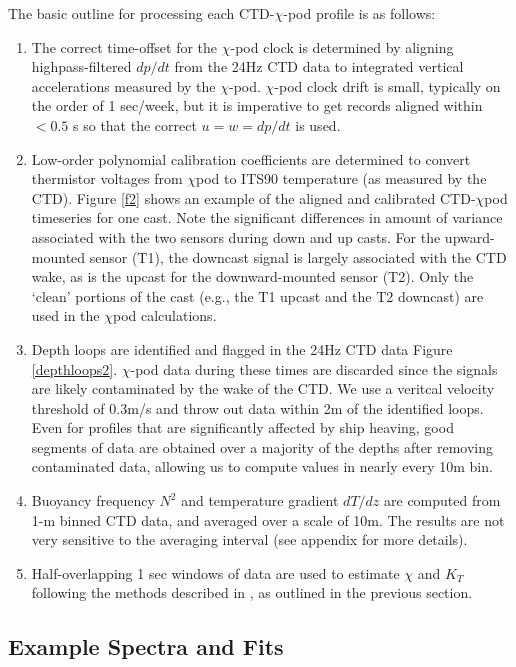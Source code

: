 \documentclass{ametsoc}
\begin{document}
The basic outline for processing each CTD-$\chi$-pod profile is as follows:
\begin{enumerate}
\item The correct time-offset for the $\chi$-pod clock is determined by aligning highpass-filtered $dp/dt$ from the 24Hz CTD data to  integrated vertical accelerations measured by the $\chi$-pod. $\chi$-pod clock drift is small, typically on the order of 1 sec/week, but it is imperative to get records aligned within $< 0.5$ s so that the correct $u = w = d p/dt$ is used.
\item Low-order polynomial calibration coefficients are determined to convert thermistor voltages from $\chi$pod to ITS90 temperature (as measured by
the CTD). Figure \ref{f2} shows an example of the aligned and calibrated CTD-$\chi$pod timeseries for one cast. Note the significant differences in amount of variance associated with the two sensors during down and up casts. For the upward-mounted sensor (T1), the downcast signal is largely associated with the CTD wake, as is the upcast for the downward-mounted sensor (T2). Only the `clean' portions of the cast (e.g., the T1 upcast and the T2 downcast) are used in the $\chi$pod calculations.
\item Depth loops are identified and flagged in the 24Hz CTD data Figure \ref{depthloops2}. $\chi$-pod data during these times are discarded since the signals are likely contaminated by the wake of the CTD. We use a veritcal velocity threshold of $0.3$m/s and throw out data within 2m of the identified loops. Even for profiles that are significantly affected by ship heaving, good segments of data are obtained over a majority of the depths after removing contaminated data, allowing us to compute values in nearly every 10m bin. 
\item Buoyancy frequency $N^2$ and temperature gradient $dT/dz$ are computed from 1-m binned CTD data, and averaged over a scale of 10m. The results are not very sensitive to the averaging interval (see appendix for more details).
\item Half-overlapping 1 sec windows of data are used to estimate $\chi$ and $K_T$ following the methods described in \cite{moumnash09}, as outlined in the previous section.
\end{enumerate}


\subsection{Example Spectra and Fits}
\end{document}
